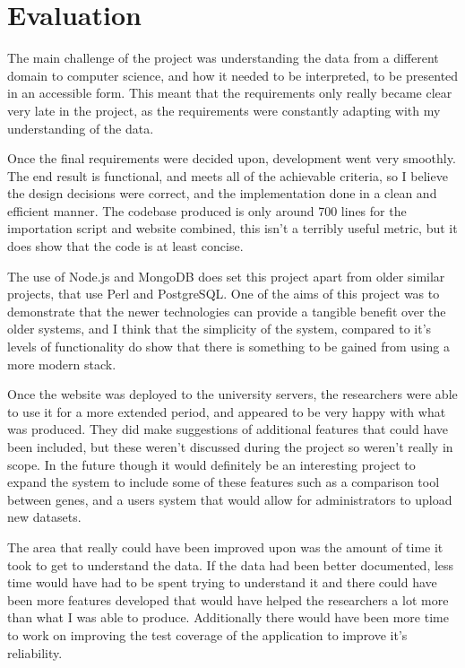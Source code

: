 \chapter{Evaluation}
The main challenge of the project was understanding the data from a different domain to computer science, and how it needed to be interpreted, to be presented in an accessible form. This meant that the requirements only really became clear very late in the project, as the requirements were constantly adapting with my understanding of the data. 

Once the final requirements were decided upon, development went very smoothly. The end result is functional, and meets all of the achievable criteria, so I believe the design decisions were correct, and the implementation done in a clean and efficient manner. The codebase produced is only around 700 lines for the importation script and website combined, this isn't a terribly useful metric, but it does show that the code is at least concise.

The use of Node.js and MongoDB does set this project apart from older similar projects, that use Perl and PostgreSQL. One of the aims of this project was to demonstrate that the newer technologies can provide a tangible benefit over the older systems, and I think that the simplicity of the system, compared to it's levels of functionality do show that there is something to be gained from using a more modern stack. 

Once the website was deployed to the university servers, the researchers were able to use it for a more extended period, and appeared to be very happy with what was produced. They did make suggestions of additional features that could have been included, but these weren't discussed during the project so weren't really in scope. In the future though it would definitely be an interesting project to expand the system to include some of these features such as a comparison tool between genes, and a users system that would allow for administrators to upload new datasets.

The area that really could have been improved upon was the amount of time it took to get to understand the data. If the data had been better documented, less time would have had to be spent trying to understand it and there could have been more features developed that would have helped the researchers a lot more than what I was able to produce. Additionally there would have been more time to work on improving the test coverage of the application to improve it's reliability.

